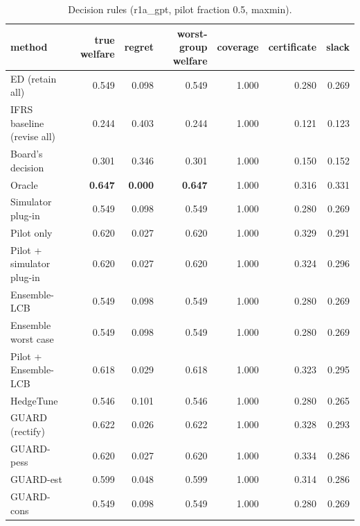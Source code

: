 \begin{table}[t]
\centering
\small
\begin{tabular}{lrrrrrr}
\toprule
method & true welfare & regret & worst-group welfare & coverage & certificate & slack \\
\midrule
ED (retain all) & 0.549 & 0.098 & 0.549 & 1.000 & 0.280 & 0.269 \\
IFRS baseline (revise all) & 0.244 & 0.403 & 0.244 & 1.000 & 0.121 & 0.123 \\
Board's decision & 0.301 & 0.346 & 0.301 & 1.000 & 0.150 & 0.152 \\
Oracle & \textbf{0.647} & \textbf{0.000} & \textbf{0.647} & 1.000 & 0.316 & 0.331 \\
Simulator plug-in & 0.549 & 0.098 & 0.549 & 1.000 & 0.280 & 0.269 \\
Pilot only & 0.620 & 0.027 & 0.620 & 1.000 & 0.329 & 0.291 \\
Pilot + simulator plug-in & 0.620 & 0.027 & 0.620 & 1.000 & 0.324 & 0.296 \\
Ensemble-LCB & 0.549 & 0.098 & 0.549 & 1.000 & 0.280 & 0.269 \\
Ensemble worst case & 0.549 & 0.098 & 0.549 & 1.000 & 0.280 & 0.269 \\
Pilot + Ensemble-LCB & 0.618 & 0.029 & 0.618 & 1.000 & 0.323 & 0.295 \\
HedgeTune & 0.546 & 0.101 & 0.546 & 1.000 & 0.280 & 0.265 \\
GUARD (rectify) & 0.622 & 0.026 & 0.622 & 1.000 & 0.328 & 0.293 \\
GUARD-pess & 0.620 & 0.027 & 0.620 & 1.000 & 0.334 & 0.286 \\
GUARD-est & 0.599 & 0.048 & 0.599 & 1.000 & 0.314 & 0.286 \\
GUARD-cons & 0.549 & 0.098 & 0.549 & 1.000 & 0.280 & 0.269 \\
\bottomrule
\end{tabular}
\caption{Decision rules (r1a\_gpt, pilot fraction 0.5, maxmin).}
\label{tab:methods-maxmin}
\end{table}
